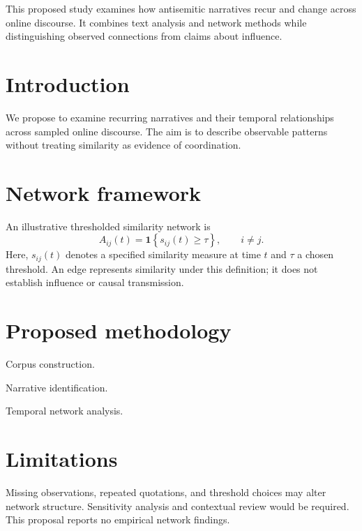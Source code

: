 

\begin{paperabstract}
This proposed study examines how antisemitic narratives recur and change across online discourse. It combines text analysis and network methods while distinguishing observed connections from claims about influence.
\end{paperabstract}

\section{Introduction}
We propose to examine recurring narratives and their temporal relationships across sampled online discourse. The aim is to describe observable patterns without treating similarity as evidence of coordination.

\section{Network framework}
An illustrative thresholded similarity network is
\[
  A_{ij}(t)=\mathbf{1}\!\left\{s_{ij}(t)\geq\tau\right\},
  \qquad i\neq j.
\]
Here, $s_{ij}(t)$ denotes a specified similarity measure at time $t$ and $\tau$ a chosen threshold. An edge represents similarity under this definition; it does not establish influence or causal transmission.

\section{Proposed methodology}
\begin{methodlist}
  \item Corpus construction.
  \item Narrative identification.
  \item Temporal network analysis.
\end{methodlist}

\section{Limitations}
Missing observations, repeated quotations, and threshold choices may alter network structure. Sensitivity analysis and contextual review would be required. This proposal reports no empirical network findings.

